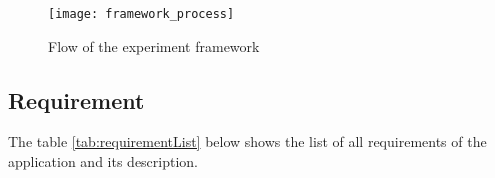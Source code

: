 \begin{figure}[!b]
\texttt{[image: framework\_process]}
\centering
\captionsetup{justification=centering}
\caption{Flow of the experiment framework}
\label{fig:mainline}
\end{figure}

\subsection{Requirement}

The table \ref{tab:requirementList} below shows the list of all requirements of the application and its description.

